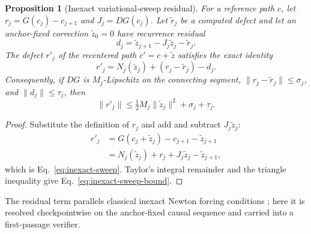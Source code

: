 \documentclass{article}
\newtheorem{proposition}{Proposition}
\begin{document}
\begin{proposition}[Inexact variational-sweep residual]
\label{prop:inexact-sweep}
For a reference path $c$, let
$r_j=G(c_j)-c_{j+1}$ and $J_j=DG(c_j)$.  Let
$\widetilde r_j$ be a computed defect and let an anchor-fixed correction
$\widetilde z_0=0$ have recurrence residual
\begin{equation}
 d_j=\widetilde z_{j+1}-J_j\widetilde z_j-\widetilde r_j.
\end{equation}
The defect $r'_j$ of the recentered path $c'=c+\widetilde z$ satisfies the
exact identity
\begin{equation}
 \boxed{r'_j=N_j(\widetilde z_j)+(r_j-\widetilde r_j)-d_j.}
 \label{eq:inexact-sweep}
\end{equation}
Consequently, if $DG$ is $M_j$-Lipschitz on the connecting segment,
$\|r_j-\widetilde r_j\|\le\sigma_j$, and $\|d_j\|\le\tau_j$, then
\begin{equation}
 \|r'_j\|\le\tfrac12M_j\|\widetilde z_j\|^2+\sigma_j+\tau_j.
 \label{eq:inexact-sweep-bound}
\end{equation}
\end{proposition}

\begin{proof}
Substitute the definition of $r_j$ and add and subtract
$J_j\widetilde z_j$:
\begin{align}
r'_j
&=G(c_j+\widetilde z_j)-c_{j+1}-\widetilde z_{j+1}\\
&=N_j(\widetilde z_j)+r_j+J_j\widetilde z_j-\widetilde z_{j+1},
\end{align}
which is Eq.~\eqref{eq:inexact-sweep}.  Taylor's integral remainder and the
triangle inequality give Eq.~\eqref{eq:inexact-sweep-bound}.
\end{proof}

The residual term parallels classical inexact Newton forcing conditions
\citep{dembo1982inexact}; here it is resolved checkpointwise on the
anchor-fixed causal sequence and carried into a first-passage verifier.
\end{document}
